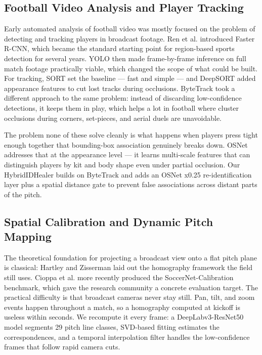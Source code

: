 \documentclass[conference]{IEEEtran}
\begin{document}
\subsection{Football Video Analysis and Player Tracking}

Early automated analysis of football video was mostly focused on the problem of detecting and tracking players in broadcast footage. Ren et al. \cite{ren2015} introduced Faster R-CNN, which became the standard starting point for region-based sports detection for several years. YOLO \cite{ultralytics2023} then made frame-by-frame inference on full match footage practically viable, which changed the scope of what could be built. For tracking, SORT \cite{bewley2016} set the baseline --- fast and simple --- and DeepSORT \cite{wojke2017} added appearance features to cut lost tracks during occlusions. ByteTrack \cite{zhang2022} took a different approach to the same problem: instead of discarding low-confidence detections, it keeps them in play, which helps a lot in football where cluster occlusions during corners, set-pieces, and aerial duels are unavoidable.

The problem none of these solve cleanly is what happens when players press tight enough together that bounding-box association genuinely breaks down. OSNet \cite{zhou2019} addresses that at the appearance level --- it learns multi-scale features that can distinguish players by kit and body shape even under partial occlusion. Our HybridIDHealer builds on ByteTrack and adds an OSNet x0.25 re-identification layer plus a spatial distance gate to prevent false associations across distant parts of the pitch.

\subsection{Spatial Calibration and Dynamic Pitch Mapping}

The theoretical foundation for projecting a broadcast view onto a flat pitch plane is classical: Hartley and Zisserman \cite{hartley2003} laid out the homography framework the field still uses. Cioppa et al. \cite{cioppa2021} more recently produced the SoccerNet-Calibration benchmark, which gave the research community a concrete evaluation target. The practical difficulty is that broadcast cameras never stay still. Pan, tilt, and zoom events happen throughout a match, so a homography computed at kickoff is useless within seconds. We recompute it every frame: a DeepLabv3-ResNet50 model segments 29 pitch line classes, SVD-based fitting estimates the correspondences, and a temporal interpolation filter handles the low-confidence frames that follow rapid camera cuts.
\end{document}
